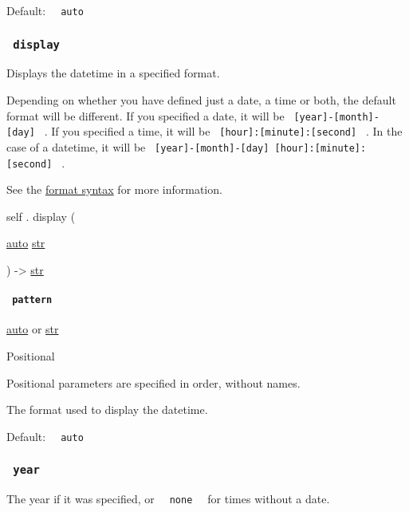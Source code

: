 Default: \texttt{\ }{\texttt{\ auto\ }}\texttt{\ }

\subsubsection{\texorpdfstring{\texttt{\ display\ }}{ display }}\label{definitions-display}

Displays the datetime in a specified format.

Depending on whether you have defined just a date, a time or both, the
default format will be different. If you specified a date, it will be
\texttt{\ {[}year{]}-{[}month{]}-{[}day{]}\ } . If you specified a time,
it will be \texttt{\ {[}hour{]}:{[}minute{]}:{[}second{]}\ } . In the
case of a datetime, it will be
\texttt{\ {[}year{]}-{[}month{]}-{[}day{]}\ {[}hour{]}:{[}minute{]}:{[}second{]}\ }
.

See the \href{/docs/reference/foundations/datetime/\#format}{format
syntax} for more information.

self { . } { display } (

{ \href{/docs/reference/foundations/auto/}{auto}
\href{/docs/reference/foundations/str/}{str} }

) -\textgreater{} \href{/docs/reference/foundations/str/}{str}

\paragraph{\texorpdfstring{\texttt{\ pattern\ }}{ pattern }}\label{definitions-display-pattern}

\href{/docs/reference/foundations/auto/}{auto} {or}
\href{/docs/reference/foundations/str/}{str}

{{ Positional }}

\label{definitions-display-pattern-positional-tooltip}
Positional parameters are specified in order, without names.

The format used to display the datetime.

Default: \texttt{\ }{\texttt{\ auto\ }}\texttt{\ }

\subsubsection{\texorpdfstring{\texttt{\ year\ }}{ year }}\label{definitions-year}

The year if it was specified, or
\texttt{\ }{\texttt{\ none\ }}\texttt{\ } for times without a date.

